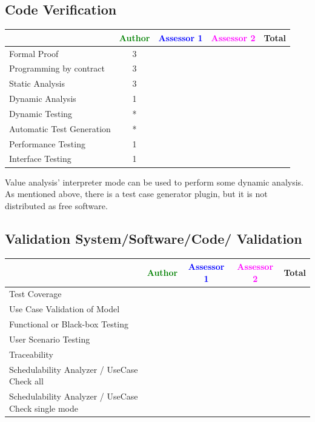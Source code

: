 \subsection{Code Verification	}


\begin{tabular}{|l | c | c | c | c|}
\hline
& \textcolor{green}{Author} & \textcolor{blue}{Assessor 1} & \textcolor{magenta}{Assessor 2} & Total \\
\hline 
Formal Proof & 3 & & &  \\
\hline
Programming by contract & 3 & & &  \\
\hline
Static Analysis & 3 & & &  \\
\hline
Dynamic Analysis & 1 & & &  \\
\hline
Dynamic Testing & * & & &  \\
\hline
Automatic Test Generation & * & & &  \\
\hline
Performance Testing & 1 & & &  \\
\hline
Interface Testing & 1 & & &  \\
\hline
\end{tabular}
\begin{author_comment}
Value analysis' interpreter mode can be used to perform some dynamic analysis.
As mentioned above, there is a test case generator plugin, but it is not
distributed as free software.
\end{author_comment}
	
\subsection{Validation System/Software/Code/ Validation	}


\begin{tabular}{|l | c | c | c | c|}
\hline
& \textcolor{green}{Author} & \textcolor{blue}{Assessor 1} & \textcolor{magenta}{Assessor 2} & Total \\
\hline 
Test Coverage & & & &  \\
\hline
Use Case Validation of Model & & & &  \\
\hline
Functional or Black-box Testing & & & &  \\
\hline
User Scenario Testing & & & &  \\
\hline
Traceability & & & &  \\
\hline
Schedulability Analyzer / UseCase Check all & & & &  \\
\hline
Schedulability Analyzer / UseCase Check single mode & & & &  \\
\hline

\end{tabular}



